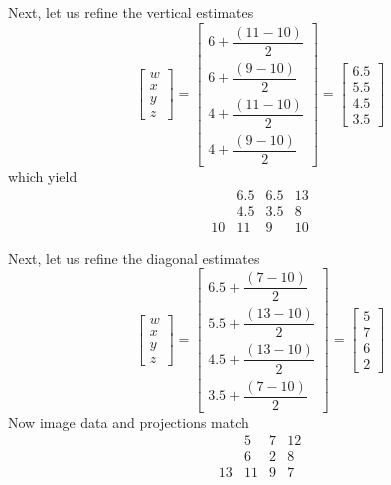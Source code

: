 \documentclass[../../../main.tex]{subfiles}
\begin{document}
Next, let us refine the vertical estimates
\begin{equation*}
    \begin{bmatrix}
        w \\ x \\ y \\ z
    \end{bmatrix}
    =
    \begin{bmatrix}
        6 + \dfrac{(11 - 10)}{2} \\
        6 + \dfrac{(9 - 10)}{2}  \\
        4 + \dfrac{(11 - 10)}{2} \\
        4 + \dfrac{(9 - 10)}{2}
    \end{bmatrix}
    =
    \begin{bmatrix}
        6.5 \\ 5.5 \\ 4.5 \\ 3.5
    \end{bmatrix}
\end{equation*}
which yield
\begin{equation*}
    \begin{matrix}
           & 6.5 & 6.5 & 13 \\
           & 4.5 & 3.5 & 8  \\
        10 & 11  & 9   & 10
    \end{matrix}
\end{equation*}

Next, let us refine the diagonal estimates
\begin{equation*}
    \begin{bmatrix}
        w \\ x \\ y \\ z
    \end{bmatrix}
    =
    \begin{bmatrix}
        6.5 + \dfrac{(7 - 10)}{2}  \\
        5.5 + \dfrac{(13 - 10)}{2} \\
        4.5 + \dfrac{(13 - 10)}{2} \\
        3.5 + \dfrac{(7 - 10)}{2}
    \end{bmatrix}
    =
    \begin{bmatrix}
        5 \\ 7 \\ 6 \\ 2
    \end{bmatrix}
\end{equation*}
Now image data and projections match
\begin{equation*}
    \begin{matrix}
           & 5  & 7 & 12 \\
           & 6  & 2 & 8  \\
        13 & 11 & 9 & 7
    \end{matrix}
\end{equation*}
\end{document}
